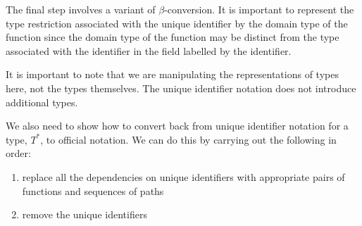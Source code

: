 The final step involves a variant of $\beta$-conversion.  It is
important to represent the type restriction associated with the unique
identifier by the domain type of the function since the domain type of
the function may be distinct from the type associated with the
identifier in the field labelled by the identifier.

It is important to note that we are manipulating the representations
of types here, not the types themselves.  The unique identifier
notation does not introduce additional types.

We also need to show how to convert back from unique identifier
notation for a type, $T^*$, to official notation.   We can do this by
carrying out the following in order:
\begin{enumerate} 
 
\item  replace all the dependencies on unique identifiers with
appropriate pairs of functions and sequences of paths
 
\item  remove the unique identifiers
 
\end{enumerate} 
  
